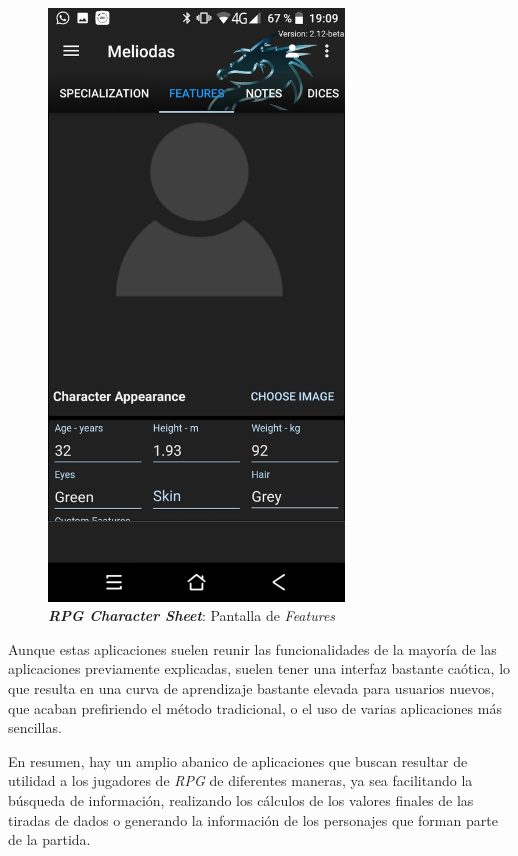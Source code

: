 \begin{figure}[H]
\begin{minipage}{0.3\textwidth}
        \includegraphics[width=0.7\textwidth]{Images/RPG_Character_Sheet_2.jpeg}
        \caption{\textit{\textbf{RPG Character Sheet}}: Pantalla de \textit{Features}}
        \label{RPGCharacterSheet2}
    \end{minipage}
\end{figure}
Aunque estas aplicaciones 
suelen reunir las funcionalidades de la mayoría de las aplicaciones previamente 
explicadas, suelen tener una interfaz bastante caótica, lo que resulta en una 
curva de aprendizaje bastante elevada para usuarios nuevos, que acaban 
prefiriendo el método tradicional, o el uso de varias aplicaciones más sencillas.

En resumen, hay un amplio abanico de aplicaciones que buscan resultar de utilidad a los 
jugadores de \textit{RPG} de diferentes maneras, ya sea facilitando la búsqueda de información, 
realizando los cálculos de los valores finales de las tiradas de dados o generando la información
de los personajes que forman parte de la partida.